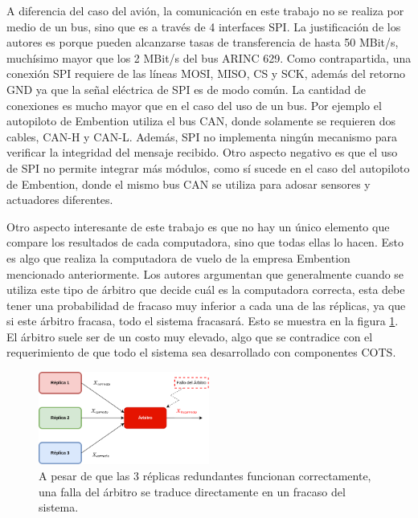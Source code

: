 A diferencia del caso del avión, la comunicación en este trabajo no se realiza por medio de un bus, sino que es a través de 4 interfaces SPI. La justificación de los autores es porque pueden alcanzarse tasas de transferencia de hasta 50 MBit/s, muchísimo mayor que los 2 MBit/s del bus ARINC 629. Como contrapartida, una conexión SPI requiere de las líneas MOSI, MISO, CS y SCK, además del retorno GND ya que la señal eléctrica de SPI es de modo común. La cantidad de conexiones es mucho mayor que en el caso del uso de un bus. Por ejemplo el autopiloto de Embention utiliza el bus CAN, donde solamente se requieren dos cables, CAN-H y CAN-L. Además, SPI no implementa ningún mecanismo para verificar la integridad del mensaje recibido. Otro aspecto negativo es que el uso de SPI no permite integrar más módulos, como sí sucede en el caso del autopiloto de Embention, donde el mismo bus CAN se utiliza para adosar sensores y actuadores diferentes.


Otro aspecto interesante de este trabajo es que no hay un único elemento que compare los resultados de cada computadora, sino que todas ellas lo hacen. Esto es algo que realiza la computadora de vuelo de la empresa Embention mencionado anteriormente. Los autores argumentan que generalmente cuando se utiliza este tipo de árbitro que decide cuál es la computadora correcta, esta debe tener una probabilidad de fracaso muy inferior a cada una de las réplicas, ya que si este árbitro fracasa, todo el sistema fracasará. Esto se muestra en la figura \ref{fig:falla_arbitro}. El árbitro suele ser de un costo muy elevado, algo que se contradice con el requerimiento de que todo el sistema sea desarrollado con componentes COTS.

\begin{figure}[H]
    \centering
    \includegraphics[width=0.5\textwidth]{img/falla_arbitro.png}
    \caption{A pesar de que las 3 réplicas redundantes funcionan correctamente, una falla del árbitro se traduce directamente en un fracaso del sistema.}
    \label{fig:falla_arbitro}
\end{figure}

